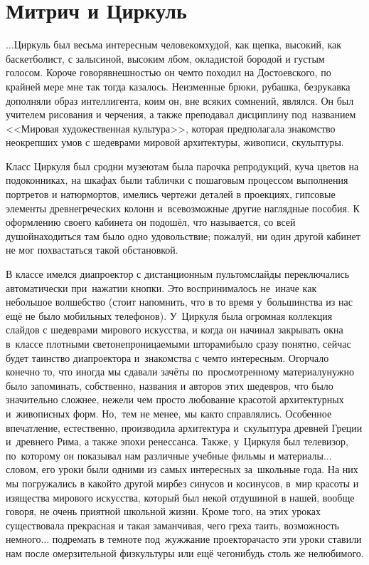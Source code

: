\newpage
\section*{Митрич и Циркуль}

$\ldots$Циркуль был весьма интересным человеком\mdash худой, как щепка, высокий, как баскетболист, с залысиной, высоким лбом, окладистой бородой и густым голосом. Короче говоря\mdash внешностью он чем\sdash то походил на Достоевского, по крайней мере мне так тогда казалось. Неизменные брюки, рубашка, безрукавка дополняли образ интеллигента, коим он, вне всяких сомнений, являлся. Он был учителем рисования и черчения, а также преподавал дисциплину под~названием <<Мировая художественная культура>>, которая предполагала знакомство неокрепших умов с шедеврами мировой архитектуры, живописи, скульптуры. 

Класс Циркуля был сродни музею\mdash там была парочка репродукций, куча цветов на подоконниках, на шкафах были таблички с пошаговым процессом выполнения портретов и натюрмортов, имелись чертежи деталей в проекциях, гипсовые элементы древнегреческих колонн и~всевозможные другие наглядные пособия. К оформлению своего кабинета он подошёл, что называется, со всей душой\mdash находиться там было одно удовольствие; пожалуй, ни один другой кабинет не мог похвастаться такой обстановкой. 

В классе имелся диапроектор с дистанционным пультом\mdash слайды переключались автоматически при~нажатии кнопки. Это воспринималось не~иначе как небольшое волшебство (стоит напомнить, что в то время у~большинства из нас ещё не было мобильных телефонов). У~Циркуля была огромная коллекция слайдов с шедеврами мирового искусства, и когда он начинал закрывать окна в~классе плотными светонепроницаемыми шторами\mdash было сразу понятно, сейчас будет таинство диапроектора и~знакомства с чем\sdash то интересным. Огорчало конечно то, что иногда мы сдавали зачёты по~просмотренному материалу\mdash нужно было запоминать, собственно, названия и авторов этих шедевров, что было значительно сложнее, нежели чем просто любование красотой архитектурных и~живописных форм. Но,~тем не менее, мы как\sdash то справлялись. Особенное впечатление, естественно, производила архитектура и~скульптура древней Греции и~древнего Рима, а также эпохи ренессанса. Также, у~Циркуля был телевизор, по~которому он показывал нам различные учебные фильмы и материалы$\ldots$ словом, его уроки были одними из самых интересных за~школьные года. На них мы погружались в какой\sdash то другой мир\mdash без синусов и косинусов, в~мир красоты и изящества мирового искусства, который был некой отдушиной в нашей, вообще говоря, не очень приятной школьной жизни. Кроме того, на этих уроках существовала прекрасная и такая заманчивая, чего греха таить, возможность немного$\ldots$ подремать в темноте под~жужжание проектора\mdash часто эти уроки ставили нам после омерзительной физкультуры или ещё чего\sdash нибудь столь же нелюбимого.


